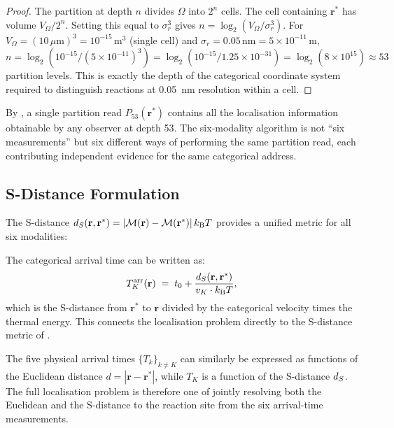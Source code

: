 \begin{proof}
The partition at depth $n$ divides $\Omega$ into $2^n$ cells.  The cell
containing $\mathbf{r}^*$ has volume $V_\Omega/2^n$.  Setting this equal to
$\sigma_r^3$ gives $n = \log_2(V_\Omega/\sigma_r^3)$.  For
$V_\Omega = (10\,\text{$\mu$m})^3 = 10^{-15}\,\text{m}^3$ (single cell) and
$\sigma_r = 0.05\,\text{nm} = 5 \times 10^{-11}\,\text{m}$, $n = \log_2(10^{-15}
/ (5 \times 10^{-11})^3) = \log_2(10^{-15}/1.25 \times 10^{-31}) = \log_2(8
\times 10^{15}) \approx 53$ partition levels.  This is exactly the depth of
the categorical coordinate system required to distinguish reactions at 0.05~nm
resolution within a cell.
\end{proof}

\begin{corollary}
\label{cor:loc-single-read}
By , a single partition read $P_{53}(\mathbf{r}^*)$
contains all the localisation information obtainable by any observer at depth
53.  The six-modality algorithm is not ``six measurements'' but six different
ways of performing the same partition read, each contributing independent
evidence for the same categorical address.
\end{corollary}

\subsection{S-Distance Formulation}

The S-distance $d_S(\mathbf{r}, \mathbf{r}^*) = |\mathcal{M}(\mathbf{r}) -
\mathcal{M}(\mathbf{r}^*)|\,k_{\mathrm{B}} T$ provides a unified metric for all six modalities:

\begin{proposition}
\label{prop:s-distance-arrival}
The categorical arrival time  can be written as:
\begin{equation}
    T_K^\mathrm{arr}(\mathbf{r})
    \;=\; t_0 + \frac{d_S(\mathbf{r}, \mathbf{r}^*)}{v_K \cdot k_{\mathrm{B}} T},
\end{equation}
which is the S-distance from $\mathbf{r}^*$ to $\mathbf{r}$ divided by the
categorical velocity times the thermal energy.  This connects the localisation
problem directly to the S-distance metric of .
\end{proposition}

The five physical arrival times $\{T_k\}_{k \ne K}$ can similarly be expressed
as functions of the Euclidean distance $d = |\mathbf{r} - \mathbf{r}^*|$, while
$T_K$ is a function of the S-distance $d_S$.  The full localisation problem is
therefore one of jointly resolving both the Euclidean and the S-distance to the
reaction site from the six arrival-time measurements.

